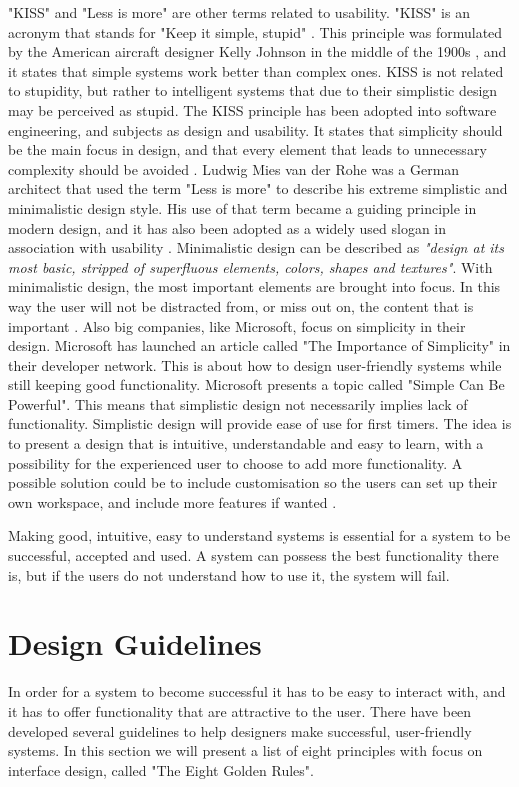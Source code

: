 "KISS" and "Less is more" are other terms related to usability. "KISS" is an acronym that stands for "Keep it simple, stupid" \cite{kiss2}. This principle was formulated by the American aircraft designer Kelly Johnson in the middle of the 1900s \cite{kiss1}, and it states that simple systems work better than complex ones. KISS is not related to stupidity, but rather to intelligent systems that due to their simplistic design may be perceived as stupid. The KISS principle has been adopted into software engineering, and subjects as design and usability. It states that simplicity should be the main focus in design, and that every element that leads to unnecessary complexity should be avoided \cite{kiss2}. Ludwig Mies van der Rohe was a German architect that used the term "Less is more" to describe his extreme simplistic and minimalistic design style. His use of that term became a guiding principle in modern design, and it has also been adopted as a widely used slogan in association with usability \cite{rohe}. Minimalistic design can be described as \emph{"design at its most basic, stripped of superfluous elements, colors, shapes and textures"}. With minimalistic design, the most important elements are brought into focus. In this way the user will not be distracted from, or miss out on, the content that is important \cite{lessismore}. Also big companies, like Microsoft, focus on simplicity in their design. Microsoft has launched an article called "The Importance of Simplicity" in their developer network. This is about how to design user-friendly systems while still keeping good functionality. Microsoft presents a topic called "Simple Can Be Powerful". This means that simplistic design not necessarily implies lack of functionality. Simplistic design will provide ease of use for first timers. The idea is to present a design that is intuitive, understandable and easy to learn, with a possibility for the experienced user to choose to add more functionality. A possible solution could be to include customisation so the users can set up their own workspace, and include more features if wanted \cite{msdnsimple}.      

Making good, intuitive, easy to understand systems is essential for a system to be successful, accepted and used. A system can possess the best functionality there is, but if the users do not understand how to use it, the system will fail.      
    
\section{Design Guidelines}
\label{sec:designguide}
In order for a system to become successful it has to be easy to interact with, and it has to offer functionality that are attractive to the user. There have been developed several guidelines to help designers make successful, user-friendly systems. In this section we will present a list of eight principles with focus on interface design, called "The Eight Golden Rules". 

